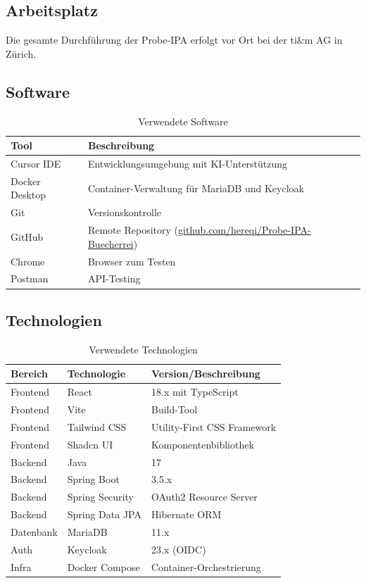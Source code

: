 \documentclass[a4paper,12pt,twoside]{report}
\begin{document}
\subsection{Arbeitsplatz}
Die gesamte Durchführung der Probe-IPA erfolgt vor Ort bei der ti\&m AG in Zürich.

\subsection{Software}

\begin{table}[H]
\centering
\caption{Verwendete Software}
\label{tab:software}
\begin{tabularx}{\textwidth}{l X}
\toprule
\textbf{Tool} & \textbf{Beschreibung} \\
\midrule
Cursor IDE & Entwicklungsumgebung mit KI-Unterstützung \\
Docker Desktop & Container-Verwaltung für MariaDB und Keycloak \\
Git & Versionskontrolle \\
GitHub & Remote Repository (\href{https://github.com/hereqi/Probe-IPA-Buecherrei}{github.com/hereqi/Probe-IPA-Buecherrei}) \\
Chrome & Browser zum Testen \\
Postman & API-Testing \\
\bottomrule
\end{tabularx}
\end{table}

\subsection{Technologien}

\begin{table}[H]
\centering
\caption{Verwendete Technologien}
\begin{tabularx}{\textwidth}{l l X}
\toprule
\textbf{Bereich} & \textbf{Technologie} & \textbf{Version/Beschreibung} \\
\midrule
Frontend & React & 18.x mit TypeScript \\
Frontend & Vite & Build-Tool \\
Frontend & Tailwind CSS & Utility-First CSS Framework \\
Frontend & Shadcn UI & Komponentenbibliothek \\
Backend & Java & 17 \\
Backend & Spring Boot & 3.5.x \\
Backend & Spring Security & OAuth2 Resource Server \\
Backend & Spring Data JPA & Hibernate ORM \\
Datenbank & MariaDB & 11.x \\
Auth & Keycloak & 23.x (OIDC) \\
Infra & Docker Compose & Container-Orchestrierung \\
\bottomrule
\end{tabularx}
\end{table}
\end{document}
